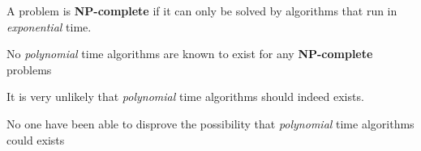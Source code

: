 \documentclass[12pt]{article}
\begin{document}
\begin{landscape}

\centerline{A problem is \textbf{NP-complete} if it can only be solved by algorithms that run in \textit{exponential} time.} 
\centerline{No \textit{polynomial} time algorithms are known to exist for any \textbf{NP-complete} problems}
\centerline{It is very unlikely that \textit{polynomial} time algorithms should indeed exists.}
\centerline{No one have been able to disprove the possibility that \textit{polynomial} time algorithms could exists}


\end{landscape}
\end{document}
